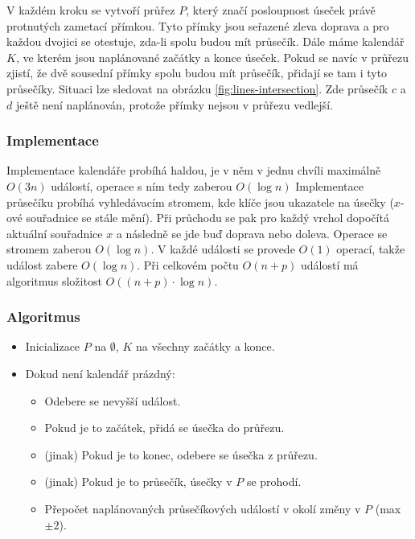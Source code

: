 V každém kroku se vytvoří průřez $P$, který značí posloupnost úseček právě protnutých zametací přímkou.
Tyto přímky jsou seřazené zleva doprava a pro každou dvojici se otestuje, zda-li spolu budou mít průsečík.
Dále máme kalendář $K$, ve kterém jsou naplánované začátky a konce úseček.
Pokud se navíc v průřezu zjistí, že dvě sousední přímky spolu budou mít průsečík, přidají se tam i tyto průsečíky.
Situaci lze sledovat na obrázku \ref{fig:lines-intersection}.
Zde průsečík $c$ a $d$ ještě není naplánován, protože přímky nejsou v průřezu vedlejší.


\subsubsection{Implementace}

Implementace kalendáře probíhá haldou, je v něm v jednu chvíli maximálně $O(3n)$ událostí, operace s ním tedy zaberou $O(\log n)$
Implementace průsečíku probíhá vyhledávacím stromem, kde klíče jsou ukazatele na úsečky ($x$-ové souřadnice se stále mění).
Při průchodu se pak pro každý vrchol dopočítá aktuální souřadnice $x$ a následně se jde buď doprava nebo doleva.
Operace se stromem zaberou $O(\log n)$.
V každé události se provede $O(1)$ operací, takže událost zabere $O(\log n)$.
Při celkovém počtu $O(n + p)$ událostí má algoritmus složitost $O((n + p) \cdot \log n)$.

\subsubsection{Algoritmus}

\begin{itemize}
    \item Inicializace $P$ na $\emptyset$, $K$ na všechny začátky a konce.
    \item Dokud není kalendář prázdný:

    \begin{itemize}
        \item Odebere se nevyšší událost.
        \item Pokud je to začátek, přidá se úsečka do průřezu.
        \item (jinak) Pokud je to konec, odebere se úsečka z průřezu.
        \item (jinak) Pokud je to průsečík, úsečky v $P$ se prohodí.
        \item Přepočet naplánovaných průsečíkových událostí v okolí změny v $P$ (max $\pm 2$).
    \end{itemize}
\end{itemize}
